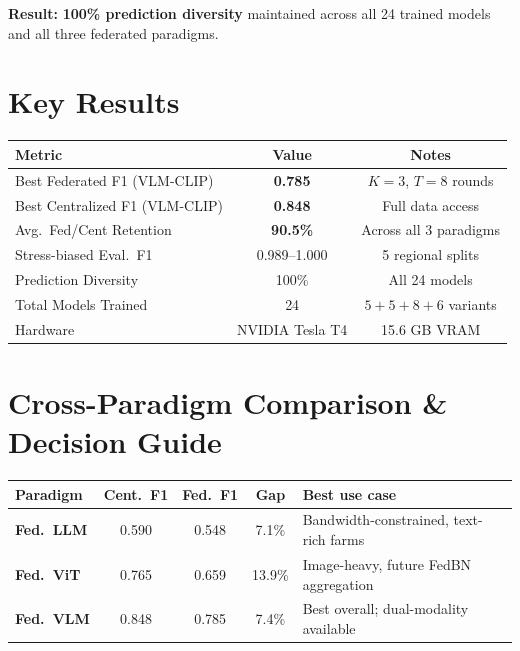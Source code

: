 \documentclass[11pt,a4paper]{article}
\begin{document}
\noindent\textbf{Result:} \textbf{100\% prediction diversity} maintained across all 24
trained models and all three federated paradigms.

\section{Key Results}

\begin{center}
\renewcommand{\arraystretch}{1.45}
\begin{tabular}{lcc}
\toprule
\textbf{Metric} & \textbf{Value} & \textbf{Notes} \\
\midrule
Best Federated F1 (VLM-CLIP)  & \textbf{0.785} & $K{=}3$, $T{=}8$ rounds \\
Best Centralized F1 (VLM-CLIP)& \textbf{0.848} & Full data access \\
Avg.\ Fed/Cent Retention       & \textbf{90.5\%} & Across all 3 paradigms \\
Stress-biased Eval.\ F1       & 0.989--1.000  & 5 regional splits \\
Prediction Diversity           & 100\%         & All 24 models \\
Total Models Trained           & 24            & $5+5+8+6$ variants \\
Hardware                       & NVIDIA Tesla T4 & 15.6 GB VRAM \\
\bottomrule
\end{tabular}
\end{center}

\section{Cross-Paradigm Comparison \& Decision Guide}

\begin{center}
\renewcommand{\arraystretch}{1.5}
\begin{tabular}{lcccl}
\toprule
\textbf{Paradigm} & \textbf{Cent.\ F1} & \textbf{Fed.\ F1} & \textbf{Gap} & \textbf{Best use case} \\
\midrule
\rowcolor{llmlight}
\textcolor{llmblue}{\bfseries Fed.\ LLM}
  & 0.590 & 0.548 & 7.1\% & Bandwidth-constrained, text-rich farms \\
\rowcolor{vitlight}
\textcolor{vitgreen}{\bfseries Fed.\ ViT}
  & 0.765 & 0.659 & 13.9\% & Image-heavy, future FedBN aggregation \\
\rowcolor{vlmlight}
\textcolor{vlmred}{\bfseries Fed.\ VLM}
  & 0.848 & 0.785 & 7.4\% & Best overall; dual-modality available \\
\bottomrule
\end{tabular}
\end{center}
\end{document}
